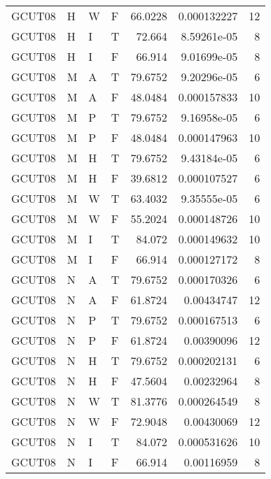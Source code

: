 \begin{table}[htb!]
{\begin{tabular}{llllrrr}
            GCUT08   & H     & W     & F          & 66.0228    & 0.000132227 & 12       \\
            GCUT08   & H     & I     & T          & 72.664     & 8.59261e-05 & 8        \\
            GCUT08   & H     & I     & F          & 66.914     & 9.01699e-05 & 8        \\
            GCUT08   & M     & A     & T          & 79.6752    & 9.20296e-05 & 6        \\
            GCUT08   & M     & A     & F          & 48.0484    & 0.000157833 & 10       \\
            GCUT08   & M     & P     & T          & 79.6752    & 9.16958e-05 & 6        \\
            GCUT08   & M     & P     & F          & 48.0484    & 0.000147963 & 10       \\
            GCUT08   & M     & H     & T          & 79.6752    & 9.43184e-05 & 6        \\
            GCUT08   & M     & H     & F          & 39.6812    & 0.000107527 & 6        \\
            GCUT08   & M     & W     & T          & 63.4032    & 9.35555e-05 & 6        \\
            GCUT08   & M     & W     & F          & 55.2024    & 0.000148726 & 10       \\
            GCUT08   & M     & I     & T          & 84.072     & 0.000149632 & 10       \\
            GCUT08   & M     & I     & F          & 66.914     & 0.000127172 & 8        \\
            GCUT08   & N     & A     & T          & 79.6752    & 0.000170326 & 6        \\
            GCUT08   & N     & A     & F          & 61.8724    & 0.00434747  & 12       \\
            GCUT08   & N     & P     & T          & 79.6752    & 0.000167513 & 6        \\
            GCUT08   & N     & P     & F          & 61.8724    & 0.00390096  & 12       \\
            GCUT08   & N     & H     & T          & 79.6752    & 0.000202131 & 6        \\
            GCUT08   & N     & H     & F          & 47.5604    & 0.00232964  & 8        \\
            GCUT08   & N     & W     & T          & 81.3776    & 0.000264549 & 8        \\
            GCUT08   & N     & W     & F          & 72.9048    & 0.00430069  & 12       \\
            GCUT08   & N     & I     & T          & 84.072     & 0.000531626 & 10       \\
            GCUT08   & N     & I     & F          & 66.914     & 0.00116959  & 8        \\
            \hline
        \end{tabular}
    }{
    }
\end{table} 
